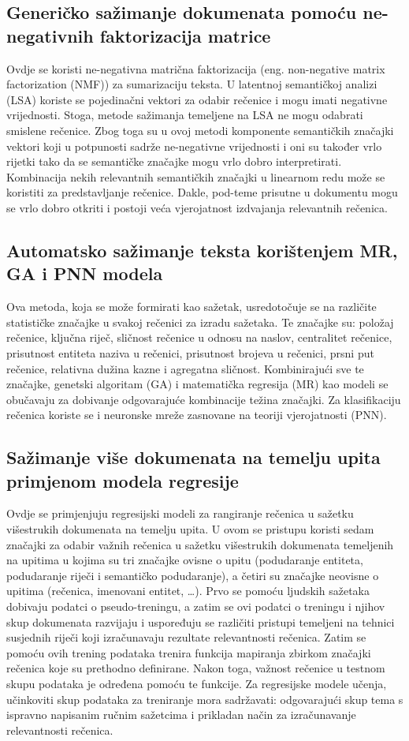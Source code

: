 \documentclass[times, utf8, zavrsni, numeric]{fer}
\begin{document}
\subsection{Generičko sažimanje dokumenata pomoću ne-negativnih faktorizacija matrice}
Ovdje se koristi ne-negativna matrična faktorizacija (eng. non-negative matrix factorization (NMF)) za sumarizaciju teksta.
U latentnoj semantičkoj analizi (LSA) koriste se pojedinačni vektori za odabir rečenice i mogu imati negativne vrijednosti. Stoga, metode sažimanja temeljene na LSA ne mogu odabrati smislene rečenice.
Zbog toga su u ovoj metodi komponente semantičkih značajki vektori koji u potpunosti sadrže ne-negativne vrijednosti i oni su također vrlo rijetki tako da se semantičke značajke mogu vrlo dobro interpretirati.
Kombinacija nekih relevantnih semantičkih značajki u linearnom redu može se koristiti za predstavljanje rečenice.
Dakle, pod-teme prisutne u dokumentu mogu se vrlo dobro otkriti i postoji veća vjerojatnost izdvajanja relevantnih rečenica.

\subsection{Automatsko sažimanje teksta korištenjem MR, GA i PNN  modela}
Ova metoda, koja se može formirati kao sažetak, usredotočuje se na različite statističke značajke u svakoj rečenici za izradu sažetaka.
Te značajke su: položaj rečenice, ključna riječ, sličnost rečenice u odnosu na naslov, centralitet rečenice, prisutnost entiteta naziva u rečenici, prisutnost brojeva u rečenici, prsni put rečenice, relativna dužina kazne i agregatna sličnost.
Kombinirajući sve te značajke, genetski algoritam (GA) i matematička regresija (MR) kao modeli se obučavaju za dobivanje odgovarajuće kombinacije težina značajki.
Za klasifikaciju rečenica koriste se i neuronske mreže zasnovane na teoriji vjerojatnosti (PNN).

\subsection{Sažimanje više dokumenata na temelju upita primjenom modela regresije}
Ovdje se primjenjuju regresijski modeli za rangiranje rečenica u sažetku višestrukih dokumenata na temelju upita.
U ovom se pristupu koristi sedam značajki za odabir važnih rečenica u sažetku višestrukih dokumenata temeljenih na upitima u kojima su tri značajke ovisne o upitu (podudaranje entiteta, podudaranje riječi i semantičko podudaranje), a četiri su značajke neovisne o upitima (rečenica, imenovani entitet, \ldots).
Prvo se pomoću ljudskih sažetaka dobivaju podatci o pseudo-treningu, a zatim se ovi podatci o treningu i njihov skup dokumenata razvijaju i uspoređuju se različiti pristupi temeljeni na tehnici susjednih riječi koji izračunavaju rezultate relevantnosti rečenica.
Zatim se pomoću ovih trening podataka trenira funkcija mapiranja zbirkom značajki rečenica koje su prethodno definirane.
Nakon toga, važnost rečenice u testnom skupu podataka je određena pomoću te funkcije.
Za regresijske modele učenja, učinkoviti skup podataka za treniranje mora sadržavati: odgovarajući skup tema s ispravno napisanim ručnim sažetcima i prikladan način za izračunavanje relevantnosti rečenica.
\end{document}
